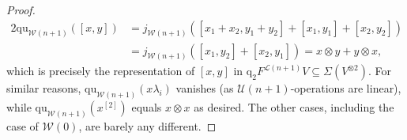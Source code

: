 \documentclass[11pt]{amsart} \renewcommand{\baselinestretch}{1.2}
\theoremstyle{plain}
\numberwithin{equation}{section} %
\theoremstyle{plain}
\numberwithin{equation}{chapter} %
\newcommand{\calU}{\mathcal{U}}
\newcommand{\calL}{\mathcal{L}}
\newcommand{\calw}{\mathcal{W}}
\newcommand{\restn}[1]{#1^{[2]}}
\newcommand{\quadratic}{\mathrm{qu}}
\newcommand{\quadgrad}[1]{\mathrm{q}_{#1}}
\begin{document}
\begin{homotopy operations for PRLs}
\begin{proof}
\begin{alignat*}{2}
\quadratic_{\calw(n+1)}([x,y])&=j_{\calw(n+1)}([{x_1}+{{x_2}},{y_1}+{{y_2}}]+[{x_1},{y_1}]+[{{x_2}},{{y_2}}])\\
&=j_{\calw(n+1)}([{x_1},{{y_2}}]+[{{x_2}},{y_1}])=x\otimes y+y\otimes x,
\end{alignat*}
which is precisely the representation of $[x,y]$ in $\quadgrad{2}F^{\calL(n+1)}V\subseteq \Sigma (V^{\otimes2})$. For similar reasons, $\quadratic_{\calw(n+1)}(x\lambda_i)$ vanishes (as $\calU(n+1)$-operations are linear), while $\quadratic_{\calw(n+1)}(\restn{x})$ equals $x\otimes x$ as desired. The other cases, including the case of $\calw(0)$, are barely any different.
\end{proof}





\end{homotopy operations for PRLs}
\end{document}

